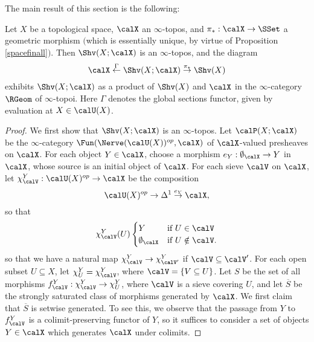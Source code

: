 The main result of this section is the following:

\begin{theorem}\label{conprod}
Let $X$ be a topological space, $\calX$ an $\infty$-topos, and
$\pi_{\ast}: \calX \rightarrow \SSet$ a geometric morphism $($which is essentially unique,
by virtue of Proposition \ref{spacefinall}{}$)$. Then $\Shv(X; \calX)$ is an $\infty$-topos, and the
diagram
$$ \calX \stackrel{\Gamma}{\leftarrow} \Shv(X; \calX) \stackrel{\pi_{\ast}}{\rightarrow} \Shv(X)$$
exhibits $\Shv(X;\calX)$ as a product of $\Shv(X)$ and $\calX$ in the $\infty$-category
$\RGeom$ of $\infty$-topoi. Here $\Gamma$ denotes the global sections functor, given by evaluation at $X \in \calU(X)$.
\end{theorem}

\begin{proof}
We first show that $\Shv(X; \calX)$ is an $\infty$-topos. Let $\calP(X; \calX)$ be the $\infty$-category
$\Fun(\Nerve(\calU(X))^{op},\calX)$ of $\calX$-valued presheaves on $\calX$. For each object
$Y \in \calX$, choose a morphism $e_Y: \emptyset_{\calX} \rightarrow Y$ in $\calX$, whose source is
an initial object of $\calX$.
For each sieve $\calV$ on $\calX$, let $\chi^Y_{\calV}: \calU(X)^{op} \rightarrow \calX$
be the composition
$$ \calU(X)^{op} \rightarrow \Delta^1 \stackrel{e_Y}{\rightarrow} \calX,$$
so that $$\chi^Y_{\calV}(U) \begin{cases} Y & \text{if } U \in \calV \\
\emptyset_{\calX} & \text{if } U \notin \calV.
\end{cases}$$
so that we have a natural map $\chi^Y_{\calV} \rightarrow \chi^Y_{\calV'}$ if
$\calV \subseteq \calV'$. For each open subset $U \subseteq X$, let
$\chi^{Y}_{U}= \chi^{Y}_{\calV}$, where $\calV = \{ V \subseteq U \}$. 
Let $S$ be the set of all morphisms
$f^{Y}_{\calV}: \chi^{Y}_{\calV} \rightarrow \chi^{Y}_{U}$, where $\calV$ is a sieve covering $U$,
and let $\overline{S}$ be the strongly saturated class of morphisms generated by $\calX$. We first claim that $\overline{S}$ is setwise generated. To see this, we observe that the passage from
$Y$ to $f^{Y}_{\calV}$ is a colimit-preserving functor of $Y$, so it suffices to consider a set of objects $Y \in \calX$ which generates $\calX$ under colimits.


\end{proof}
